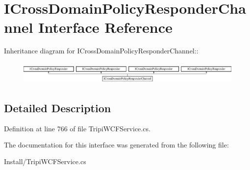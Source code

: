 \hypertarget{interface_i_cross_domain_policy_responder_channel}{
\section{ICrossDomainPolicyResponderChannel Interface Reference}
\label{interface_i_cross_domain_policy_responder_channel}
}
Inheritance diagram for ICrossDomainPolicyResponderChannel::\begin{figure}[H]
\begin{center}
\leavevmode
\includegraphics[height=1.16183cm]{interface_i_cross_domain_policy_responder_channel}
\end{center}
\end{figure}


\subsection{Detailed Description}


Definition at line 766 of file TripiWCFService.cs.

The documentation for this interface was generated from the following file:\begin{DoxyCompactItemize}
\item 
Install/TripiWCFService.cs\end{DoxyCompactItemize}
